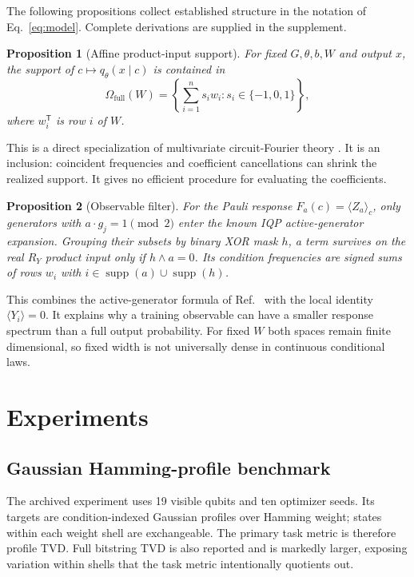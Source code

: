 \documentclass[a4paper,twocolumn,11pt,unpublished]{quantumarticle}
\newtheorem{proposition}{Proposition}
\newcommand{\supp}{\operatorname{supp}}
\begin{document}
The following propositions collect established structure in the notation of
Eq.~\eqref{eq:model}.  Complete derivations are supplied in the supplement.

\begin{proposition}[Affine product-input support]
For fixed $G,\theta,b,W$ and output $x$, the support of
$c\mapsto q_\theta(x\mid c)$ is contained in
\begin{equation}
 \Omega_{\mathrm{full}}(W)=
 \left\{\sum_{i=1}^{n}s_iw_i:s_i\in\{-1,0,1\}\right\},
 \label{eq:full-support}
\end{equation}
where $w_i^\mathsf{T}$ is row $i$ of $W$.
\end{proposition}

This is a direct specialization of multivariate circuit-Fourier theory
\cite{gilVidalInputRedundancy2020,schuldEffectDataEncoding2021,
casasMultidimensionalFourier2023}.  It is an inclusion: coincident frequencies
and coefficient cancellations can shrink the realized support.  It gives no
efficient procedure for evaluating the coefficients.

\begin{proposition}[Observable filter]
For the Pauli response $F_a(c)=\langle Z_a\rangle_c$, only generators with
$a\cdot g_j=1\pmod 2$ enter the known IQP active-generator expansion.  Grouping
their subsets by binary XOR mask $h$, a term survives on the real $R_Y$
product input only if $h\wedge a=0$.  Its condition frequencies are signed
sums of rows $w_i$ with $i\in\supp(a)\cup\supp(h)$.
\end{proposition}

This combines the active-generator formula of
Ref.~\cite{recio-armengolTrainClassicalDeploy2026} with the local identity
$\langle Y_i\rangle=0$.  It explains why a training observable can have a
smaller response spectrum than a full output probability.  For fixed $W$ both
spaces remain finite dimensional, so fixed width is not universally dense in
continuous conditional laws.

\section{Experiments}
\label{sec:experiments}

\subsection{Gaussian Hamming-profile benchmark}

The archived experiment uses 19 visible qubits and ten optimizer seeds.  Its
targets are condition-indexed Gaussian profiles over Hamming weight; states
within each weight shell are exchangeable.  The primary task metric is
therefore profile TVD.  Full bitstring TVD is also reported and is markedly
larger, exposing variation within shells that the task metric intentionally
quotients out.
\end{document}
